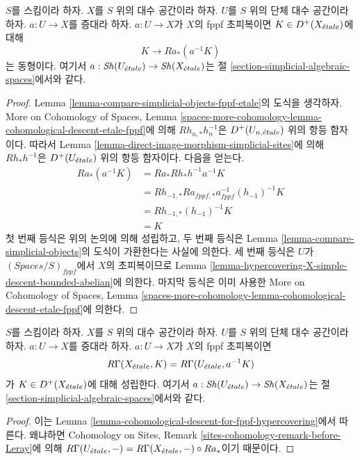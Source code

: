 \begin{lemma}
\label{lemma-cohomological-descent-for-fppf-hypercovering}
$S$를 스킴이라 하자. $X$를 $S$ 위의 대수 공간이라 하자.
$U$를 $S$ 위의 단체 대수 공간이라 하자. $a : U \to X$를
증대라 하자. $a : U \to X$가 $X$의 fppf 초피복이면
$K \in D^+(X_{\acute{e}tale})$에 대해
$$
K \to Ra_*(a^{-1}K)
$$
는 동형이다. 여기서
$a : \mathop{\mathit{Sh}}\nolimits(U_{\acute{e}tale}) \to \mathop{\mathit{Sh}}\nolimits(X_{\acute{e}tale})$는 절
\ref{section-simplicial-algebraic-spaces}에서와 같다.
\end{lemma}

\begin{proof}
Lemma \ref{lemma-compare-simplicial-objects-fppf-etale}의
도식을 생각하자.
More on Cohomology of Spaces, Lemma
\ref{spaces-more-cohomology-lemma-cohomological-descent-etale-fppf}에 의해
$Rh_{n, *}h_n^{-1}$은 $D^+(U_{n, {\acute{e}tale}})$ 위의 항등 함자이다.
따라서 Lemma \ref{lemma-direct-image-morphism-simplicial-sites}에 의해
$Rh_*h^{-1}$은 $D^+(U_{\acute{e}tale})$ 위의 항등 함자이다.
다음을 얻는다.
\begin{align*}
Ra_*(a^{-1}K)
& =
Ra_*Rh_*h^{-1}a^{-1}K \\
& =
Rh_{-1, *}Ra_{fppf, *}a_{fppf}^{-1}(h_{-1})^{-1}K \\
& =
Rh_{-1, *}(h_{-1})^{-1}K \\
& =
K
\end{align*}
첫 번째 등식은 위의 논의에 의해 성립하고, 두 번째 등식은
Lemma \ref{lemma-compare-simplicial-objects}의 도식이 가환한다는
사실에 의한다. 세 번째 등식은 $U$가
$(\textit{Spaces}/S)_{fppf}$에서 $X$의 초피복이므로
Lemma \ref{lemma-hypercovering-X-simple-descent-bounded-abelian}에 의한다.
마지막 등식은 이미 사용한
More on Cohomology of Spaces, Lemma
\ref{spaces-more-cohomology-lemma-cohomological-descent-etale-fppf}에 의한다.
\end{proof}

\begin{lemma}
\label{lemma-compute-via-fppf-hypercovering}
$S$를 스킴이라 하자. $X$를 $S$ 위의 대수 공간이라 하자.
$U$를 $S$ 위의 단체 대수 공간이라 하자. $a : U \to X$를
증대라 하자. $a : U \to X$가 $X$의 fppf 초피복이면
$$
R\Gamma(X_{\acute{e}tale}, K) = R\Gamma(U_{\acute{e}tale}, a^{-1}K)
$$
가 $K \in D^+(X_{\acute{e}tale})$에 대해 성립한다. 여기서
$a : \mathop{\mathit{Sh}}\nolimits(U_{\acute{e}tale}) \to \mathop{\mathit{Sh}}\nolimits(X_{\acute{e}tale})$는 절
\ref{section-simplicial-algebraic-spaces}에서와 같다.
\end{lemma}

\begin{proof}
이는 Lemma \ref{lemma-cohomological-descent-for-fppf-hypercovering}에서
따른다. 왜냐하면 Cohomology on Sites, Remark
\ref{sites-cohomology-remark-before-Leray}에 의해
$R\Gamma(U_{\acute{e}tale}, -) = R\Gamma(X_{\acute{e}tale}, -) \circ Ra_*$이기 때문이다.
\end{proof}

